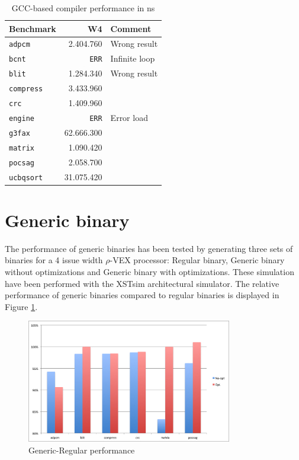 \begin{table}
  \centering
    \begin{tabular}{|l|r|l|}
    \hline
    \textbf{Benchmark} & \multicolumn{1}{|r|}{\textbf{W4}} & \textbf{Comment} \\ \hline
	\texttt{adpcm} 		& 2.404.760 	&	Wrong result 	\\ \hline
	\texttt{bcnt} 		& \texttt{ERR}	&	Infinite loop	\\ \hline
	\texttt{blit} 		& 1.284.340 	&	Wrong result 	\\ \hline
	\texttt{compress} 	& 3.433.960 	&	\\ \hline
	\texttt{crc} 		& 1.409.960 	&	\\ \hline
	\texttt{engine} 	& \texttt{ERR}	&	Error load		\\ \hline
	\texttt{g3fax} 		& 62.666.300 	&	\\ \hline
	\texttt{matrix} 	& 1.090.420 	&	\\ \hline
	\texttt{pocsag} 	& 2.058.700 	&	\\ \hline
	\texttt{ucbqsort} 	& 31.075.420 	&	\\ \hline
    \end{tabular}
  \caption{GCC-based compiler performance in ns}
  \label{tbl:GCC_perf}
\end{table}

\section{Generic binary}
The performance of generic binaries has been tested by generating three sets of binaries for a 4 issue width $\rho$-VEX processor: Regular binary, Generic binary without optimizations and Generic binary with optimizations. These simulation have been performed with the XSTsim architectural simulator. The relative performance of generic binaries compared to regular binaries is displayed in Figure \ref{fig:rel_gen}.

\begin{figure}[ht]
\centering
\includegraphics[width=0.8\textwidth]{5_results/img/rel_gen.png}
\caption{Generic-Regular performance}
\label{fig:rel_gen}
\end{figure}


